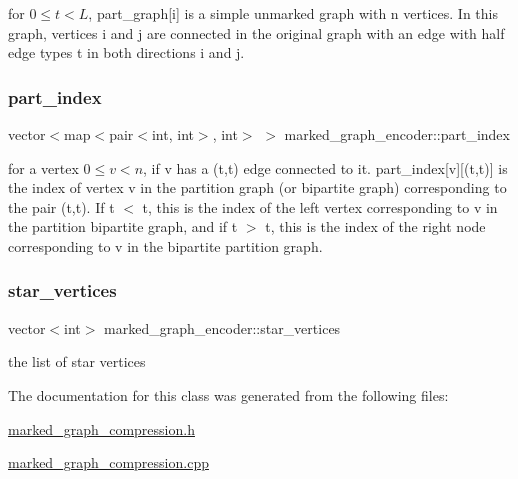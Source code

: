 for $0 \leq t < L$, part\+\_\+graph\mbox{[}i\mbox{]} is a simple unmarked graph with n vertices. In this graph, vertices i and j are connected in the original graph with an edge with half edge types t in both directions i and j. 

\mbox{\label{classmarked__graph__encoder_a1d3e2b90f5d46244fd4cb33c69ac81f1}} 
\subsubsection{\texorpdfstring{part\+\_\+index}{part\_index}}
{\footnotesize\ttfamily vector$<$map$<$pair$<$int, int$>$, int$>$ $>$ marked\+\_\+graph\+\_\+encoder\+::part\+\_\+index\hspace{0.3cm}{\ttfamily [private]}}



for a vertex $0 \leq v < n$, if v has a (t,t\textquotesingle{}) edge connected to it. part\+\_\+index\mbox{[}v\mbox{]}\mbox{[}(t,t\textquotesingle{})\mbox{]} is the index of vertex v in the partition graph (or bipartite graph) corresponding to the pair (t,t\textquotesingle{}). If t $<$ t\textquotesingle{}, this is the index of the left vertex corresponding to v in the partition bipartite graph, and if t $>$ t\textquotesingle{}, this is the index of the right node corresponding to v in the bipartite partition graph. 

\mbox{\label{classmarked__graph__encoder_a08fdf6fcd7dcd8c5d1667f2d7ff06c2c}} 
\subsubsection{\texorpdfstring{star\+\_\+vertices}{star\_vertices}}
{\footnotesize\ttfamily vector$<$int$>$ marked\+\_\+graph\+\_\+encoder\+::star\+\_\+vertices\hspace{0.3cm}{\ttfamily [private]}}



the list of star vertices 



The documentation for this class was generated from the following files\+:\begin{DoxyCompactItemize}
\item 
\hyperlink{marked__graph__compression_8h}{marked\+\_\+graph\+\_\+compression.\+h}\item 
\hyperlink{marked__graph__compression_8cpp}{marked\+\_\+graph\+\_\+compression.\+cpp}\end{DoxyCompactItemize}
